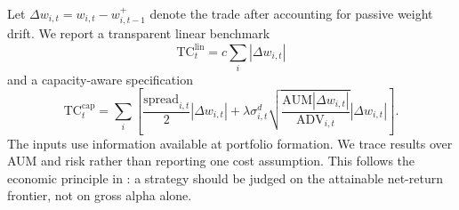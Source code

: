 Let $\Delta w_{i,t}=w_{i,t}-w_{i,t-1}^{+}$ denote the trade after accounting for passive weight drift. We report a transparent linear benchmark
\[
\mathrm{TC}_{t}^{\mathrm{lin}}
=
c\sum_i|\Delta w_{i,t}|
\]
and a capacity-aware specification
\begin{equation}
\mathrm{TC}_{t}^{\mathrm{cap}}
=
\sum_i
\left[
\frac{\mathrm{spread}_{i,t}}{2}|\Delta w_{i,t}|
+
\lambda\sigma_{i,t}^{d}
\sqrt{
\frac{\mathrm{AUM}|\Delta w_{i,t}|}
{\mathrm{ADV}_{i,t}}
}
|\Delta w_{i,t}|
\right].
\label{eq:capacity-cost}
\end{equation}
The inputs use information available at portfolio formation. We trace results over AUM and risk rather than reporting one cost assumption. This follows the economic principle in \citet{JensenKellyMalamudPedersen2026}: a strategy should be judged on the attainable net-return frontier, not on gross alpha alone.
